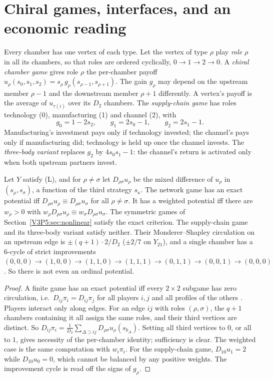 \section{Chiral games, interfaces, and an economic reading}\label{V3P5:sec:chiral}

Every chamber has one vertex of each type. Let the vertex of type $\rho$ play \emph{role} $\rho$ in
all its chambers, so that roles are ordered cyclically, $0\to1\to2\to0$. A \emph{chiral chamber
game} gives role $\rho$ the per-chamber payoff $u_\rho(s_0,s_1,s_2)=s_\rho\,g_\rho(s_{\rho-1},s_{\rho+1})$.
The gain $g_\rho$ may depend on the upstream member $\rho-1$ and the downstream member $\rho+1$
differently. A vertex's payoff is the average of $u_{\tau(i)}$ over its $D_2$ chambers. The
\emph{supply-chain game} has roles technology (0), manufacturing (1) and channel (2), with
\[
g_0=1-2s_2,\qquad g_1=2s_0-1,\qquad g_2=2s_1-1 .
\]
Manufacturing's investment pays only if technology invested; the channel's pays only if
manufacturing did; technology is held up once the channel invests. The \emph{three-body variant}
replaces $g_2$ by $4s_0s_1-1$: the channel's return is activated only when both upstream partners
invest.

\begin{theorem}\label{V3P5:thm:potcrit}
Let $Y$ satisfy \textup{(L)}, and for $\rho\ne\sigma$ let $D_{\rho\sigma}u_\rho$ be the mixed
difference of $u_\rho$ in $(s_\rho,s_\sigma)$, a function of the third strategy $s_\kappa$. The
network game has an exact potential iff $D_{\rho\sigma}u_\rho\equiv D_{\rho\sigma}u_\sigma$ for
all $\rho\ne\sigma$. It has a weighted potential iff there are $w_\rho>0$ with
$w_\rho D_{\rho\sigma}u_\rho\equiv w_\sigma D_{\rho\sigma}u_\sigma$. The symmetric games of
Section~\ref{V3P5:sec:nonlinear} satisfy the exact criterion. The supply-chain game and its
three-body variant satisfy neither. Their Monderer--Shapley circulation on an upstream edge is
$\pm(q+1)\cdot2/D_2$ ($\pm2/7$ on $Y_{21}$), and a single chamber has a $6$-cycle of strict
improvements
$(0,0,0)\to(1,0,0)\to(1,1,0)\to(1,1,1)\to(0,1,1)\to(0,0,1)\to(0,0,0)$. So there is not even an
ordinal potential.
\end{theorem}

\begin{proof}
A finite game has an exact potential iff every $2\times2$ subgame has zero circulation, i.e.\
$D_{ij}\pi_i=D_{ij}\pi_j$ for all players $i,j$ and all profiles of the others \cite{MS96}.
Players interact only along edges. For an edge $ij$ with roles $(\rho,\sigma)$, the $q+1$
chambers containing it all assign the same roles, and their third vertices are distinct. So
$D_{ij}\pi_i=\frac1{D_2}\sum_{\Delta\supset ij}D_{\rho\sigma}u_\rho(s_{k_\Delta})$. Setting all
third vertices to $0$, or all to $1$, gives necessity of the per-chamber identity; sufficiency is
clear. The weighted case is the same computation with $w_i\pi_i$. For the supply-chain game,
$D_{10}u_1=2$ while $D_{10}u_0=0$, which cannot be balanced by any positive weights. The
improvement cycle is read off the signs of $g_\rho$.
\end{proof}


